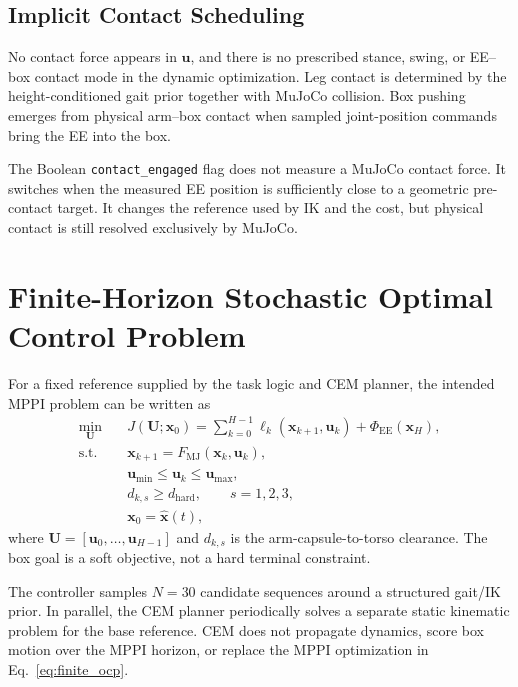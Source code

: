\documentclass[11pt,a4paper]{article}
\newcommand{\code}[1]{\texttt{#1}}
\begin{document}
\subsection{Implicit Contact Scheduling}

No contact force appears in $\bm{u}$, and there is no prescribed stance,
swing, or EE--box contact mode in the dynamic optimization. Leg contact is
determined by the height-conditioned gait prior together with MuJoCo
collision. Box pushing emerges from physical arm--box contact when sampled
joint-position commands bring the EE into the box.

The Boolean \code{contact\_engaged} flag does not measure a MuJoCo contact
force. It switches when the measured EE position is sufficiently close to a
geometric pre-contact target. It changes the reference used by IK and the
cost, but physical contact is still resolved exclusively by MuJoCo.

\section{Finite-Horizon Stochastic Optimal Control Problem}

For a fixed reference supplied by the task logic and CEM planner, the intended
MPPI problem can be written as
\begin{equation}
\boxed{
\begin{aligned}
\min_{\bm{U}}\quad
  &J(\bm{U};\bm{x}_0)
   =\sum_{k=0}^{H-1}\ell_k(\bm{x}_{k+1},\bm{u}_k)
    +\Phi_{\mathrm{EE}}(\bm{x}_H),\\
\mathrm{s.t.}\quad
  &\bm{x}_{k+1}=F_{\mathrm{MJ}}(\bm{x}_k,\bm{u}_k),\\
  &\bm{u}_{\min}\leq\bm{u}_k\leq\bm{u}_{\max},\\
  &d_{k,s}\geq d_{\mathrm{hard}},\qquad s=1,2,3,\\
  &\bm{x}_0=\hat{\bm{x}}(t),
\end{aligned}}
\label{eq:finite_ocp}
\end{equation}
where $\bm{U}=[\bm{u}_0,\ldots,\bm{u}_{H-1}]$ and $d_{k,s}$ is the
arm-capsule-to-torso clearance. The box goal is a soft objective, not a hard
terminal constraint.

The controller samples $N=30$ candidate sequences around a structured
gait/IK prior. In parallel, the CEM planner periodically solves a separate
static kinematic problem for the base reference. CEM does not propagate
dynamics, score box motion over the MPPI horizon, or replace the MPPI
optimization in Eq.~\eqref{eq:finite_ocp}.
\end{document}
